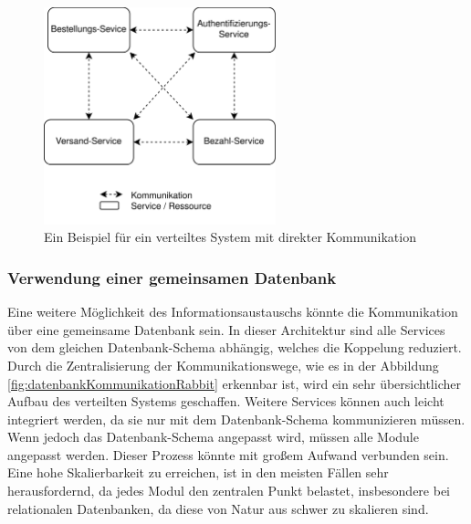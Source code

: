 \begin{figure}
    \centering
    \includegraphics[width=0.6\textwidth]{content/img/Research/Message_Services/direktKommunikationMOM.png}
    \caption{Ein Beispiel für ein verteiltes System mit direkter Kommunikation \cite{curryMessageOrientedMiddleware2004}}
    \label{fig:direkteKommunikationMOM}
\end{figure}
\FloatBarrier

\subsubsection{Verwendung einer gemeinsamen Datenbank}

Eine weitere Möglichkeit des Informationsaustauschs könnte die Kommunikation über eine gemeinsame Datenbank sein. In dieser Architektur sind alle Services von dem gleichen Datenbank-Schema abhängig, welches die Koppelung reduziert. Durch die Zentralisierung der Kommunikationswege, wie es in der Abbildung \ref{fig:datenbankKommunikationRabbit} erkennbar ist, wird ein sehr übersichtlicher Aufbau des verteilten Systems geschaffen. Weitere Services können auch leicht integriert werden, da sie nur mit dem Datenbank-Schema kommunizieren müssen. Wenn jedoch das Datenbank-Schema angepasst wird, müssen alle Module angepasst werden. Dieser Prozess könnte mit großem Aufwand verbunden sein. Eine hohe Skalierbarkeit zu erreichen, ist in den meisten Fällen sehr herausfordernd, da jedes Modul den zentralen Punkt belastet, insbesondere bei relationalen Datenbanken, da diese von Natur aus schwer zu skalieren sind. \cite{toshevLearningRabbitMQBuild2016,curryMessageOrientedMiddleware2004}

